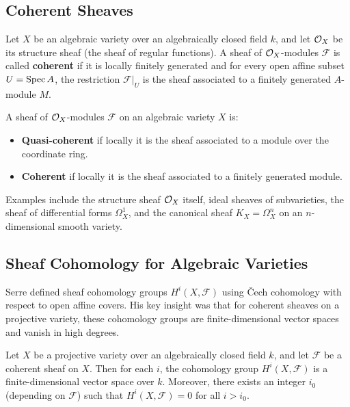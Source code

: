 \subsection{Coherent Sheaves}

Let \(X\) be an algebraic variety over an algebraically closed field \(k\), and let \(\mathcal{O}_X\) be its structure sheaf (the sheaf of regular functions). A sheaf of \(\mathcal{O}_X\)-modules \(\mathcal{F}\) is called \textbf{coherent} if it is locally finitely generated and for every open affine subset \(U = \operatorname{Spec} A\), the restriction \(\mathcal{F}|_U\) is the sheaf associated to a finitely generated \(A\)-module \(M\).

\begin{definition}
A sheaf of \(\mathcal{O}_X\)-modules \(\mathcal{F}\) on an algebraic variety \(X\) is:
\begin{itemize}
    \item \textbf{Quasi-coherent} if locally it is the sheaf associated to a module over the coordinate ring.
    \item \textbf{Coherent} if locally it is the sheaf associated to a finitely generated module.
\end{itemize}
\end{definition}

Examples include the structure sheaf \(\mathcal{O}_X\) itself, ideal sheaves of subvarieties, the sheaf of differential forms \(\Omega^1_X\), and the canonical sheaf \(K_X = \Omega^n_X\) on an \(n\)-dimensional smooth variety.

\subsection{Sheaf Cohomology for Algebraic Varieties}

Serre defined sheaf cohomology groups \(H^i(X, \mathcal{F})\) using \v{C}ech cohomology with respect to open affine covers. His key insight was that for coherent sheaves on a projective variety, these cohomology groups are finite-dimensional vector spaces and vanish in high degrees.

\begin{theorem}
Let \(X\) be a projective variety over an algebraically closed field \(k\), and let \(\mathcal{F}\) be a coherent sheaf on \(X\). Then for each \(i\), the cohomology group \(H^i(X, \mathcal{F})\) is a finite-dimensional vector space over \(k\). Moreover, there exists an integer \(i_0\) (depending on \(\mathcal{F}\)) such that \(H^i(X, \mathcal{F}) = 0\) for all \(i > i_0\).
\end{theorem}

